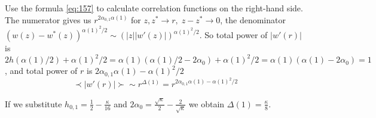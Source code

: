 \documentclass[12pt]{article}
\begin{document}
Use the formula \eqref{eq:157} to calculate correlation functions on the right-hand side. The
numerator gives us $r^{2\alpha_{0,1}\alpha(1)}$ for $z,z^{*}\to r,\; z-z^{*}\to 0$, the denominator
$(w(z)-w^{*}(z))^{\alpha(1)^{2}/2}\sim (|z| |w'(z)|)^{\alpha(1)^{2}/2}$. So total power of $|w'(r)|$
is 
$2h(\alpha(1)/2)+\alpha(1)^{2}/2=\alpha(1)
(\alpha(1)/2-2\alpha_{0})+\alpha(1)^{2}/2=\alpha(1)(\alpha(1)-2\alpha_{0})=1$, and total power of
$r$ is $2\alpha_{0,1}\alpha(1)-\alpha(1)^{2}/2$
\begin{equation}
  \label{eq:158}
  \prec |w'(r)|\succ \sim r^{\Delta(1)}=r^{2\alpha_{0,1}\alpha(1)-\alpha(1)^{2}/2}
\end{equation}

If we substitute $h_{0,1}=\frac{1}{2}-\frac{\kappa}{16}$ and
$2\alpha_{0}=\frac{\sqrt{\kappa}}{2}-\frac{2}{\sqrt{\kappa}}$ we obtain $\Delta(1)=\frac{\kappa}{8}$.



\end{document}
